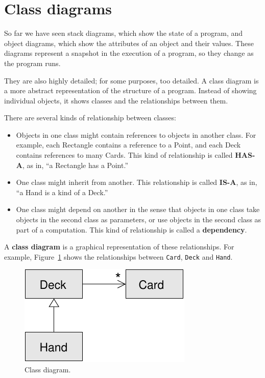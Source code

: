 \documentclass[10pt]{book}
\begin{document}
\section{Class diagrams}
\label{class.diagram}

So far we have seen stack diagrams, which show the state of
a program, and object diagrams, which show the attributes
of an object and their values.  These diagrams represent a snapshot
in the execution of a program, so they change as the program
runs.

They are also highly detailed; for some purposes, too
detailed.  A class diagram is a more abstract representation
of the structure of a program.  Instead of showing individual
objects, it shows classes and the relationships between them.

There are several kinds of relationship between classes:

\begin{itemize}

\item Objects in one class might contain references to objects
in another class.  For example, each Rectangle contains a reference
to a Point, and each Deck contains references to many Cards.
This kind of relationship is called {\bf HAS-A}, as in, ``a Rectangle
has a Point.''

\item One class might inherit from another.  This relationship
is called {\bf IS-A}, as in, ``a Hand is a kind of a Deck.''

\item One class might depend on another in the sense that objects
in one class take objects in the second class as parameters, or
use objects in the second class as part of a computation.  This
kind of relationship is called a {\bf dependency}.

\end{itemize}

A {\bf class diagram} is a graphical representation of these
relationships.  For example, Figure~\ref{fig.class1} shows the
relationships between {\tt Card}, {\tt Deck} and {\tt Hand}.

\begin{figure}
\centerline
{\includegraphics[scale=0.8]{figs/class1.pdf}}
\caption{Class diagram.}
\label{fig.class1}
\end{figure}
\end{document}
